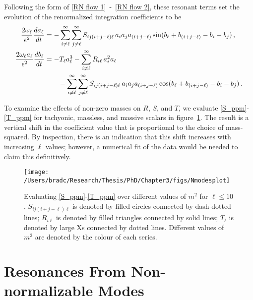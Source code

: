 \documentclass[../PhD.tex]{subfiles}
\begin{document}
Following the form of \eqref{RN flow 1}~-~\eqref{RN flow 2}, these resonant terms set the evolution of the renormalized integration coefficients to be \cite{1412.3249}
\begin{align}
\frac{2 \ol}{\epsilon^2} \frac{d a_\ell}{d t} &= -  \sum_{i \neq \ell}^\infty \sum_{j \neq \ell}^\infty S_{i j (i + j - \ell) \ell} \, a_i a_j a_{(i + j - \ell)} \sin ( b_\ell + b_{(i+j-\ell)} - b_i - b_j ) \, , \\
\frac{2 \ol a_\ell}{\epsilon^2} \frac{d b_\ell}{d t} &= - T_\ell a_\ell^3 - \sum^\infty_{i \neq \ell} R_{i\ell} \, a_i^2 a_\ell \nonumber \\
%
& \qquad - \sum_{i \neq \ell}^\infty \sum_{j \neq \ell}^\infty S_{i j (i + j - \ell) \ell} \, a_i a_j a_{(i + j - \ell)} \cos( b_\ell + b_{(i+j-\ell)} - b_i - b_j ) \, .
\end{align}

To examine the effects of non-zero masses on $R$, $S$, and $T$, we evaluate \eqref{S_ppm}-\eqref{T_ppm} for tachyonic, massless, and massive scalars in figure~\ref{fig: Nmodes}. The result is a vertical shift in the coefficient value that is proportional to the choice of mass-squared. By inspection, there is an indication that this shift increases with increasing $\ell$ values; however, a numerical fit of the data would be needed to claim this definitively. 

\begin{figure}
\centering
	\texttt{[image: /Users/bradc/Research/Thesis/PhD/Chapter3/figs/Nmodesplot]}
	\caption[Evaluating non-vanishing resonances for normalizable modes over a range of $m^2$ values]{Evaluating \eqref{S_ppm}-\eqref{T_ppm} over different values of $m^2$ for $\ell \leq 10$. $S_{ij(i+j-\ell)\ell}$ is denoted by filled circles connected by dash-dotted lines; $R_{i\ell}$ is denoted by filled triangles connected by solid lines; $T_{\ell}$ is denoted by large Xs connected by dotted lines. Different values of $m^2$ are denoted by the colour of each series.}
	\label{fig: Nmodes}
\end{figure}



\section{Resonances From Non-normalizable Modes}
\label{sec: NNmodes}
\end{document}
